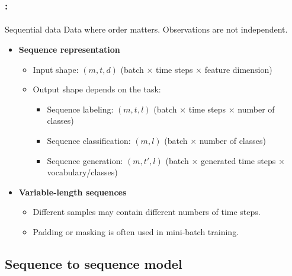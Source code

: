 \documentclass[xcolor=table]{beamer}
\begin{document}
	\begin{frame}
		\frametitle{\insertshortsubtitle: \insertsection}
		\framesubtitle{\insertsubsection}
		
		\begin{block}{Sequential data}
			Data where order matters. Observations are not independent.
		\end{block}
		
		\begin{itemize}
			
			\item \textbf{Sequence representation}
			\begin{itemize}
				\item Input shape: $(m, t, d)$ (batch × time steps × feature dimension)
				
				\item Output shape depends on the task:
				\begin{itemize}
					
					\item Sequence labeling: $(m, t, l)$ (batch × time steps × number of classes)
					
					\item Sequence classification: $(m, l)$ (batch × number of classes)
					
					\item Sequence generation: $(m, t', l)$ (batch × generated time steps × vocabulary/classes)
					
				\end{itemize}
			\end{itemize}
			
			\item \textbf{Variable-length sequences}
			\begin{itemize}
				\item Different samples may contain different numbers of time steps.
				\item Padding or masking is often used in mini-batch training.
			\end{itemize}
			
		\end{itemize}
		
	\end{frame}
	
	\subsection{Sequence to sequence model}
	
\end{document}
